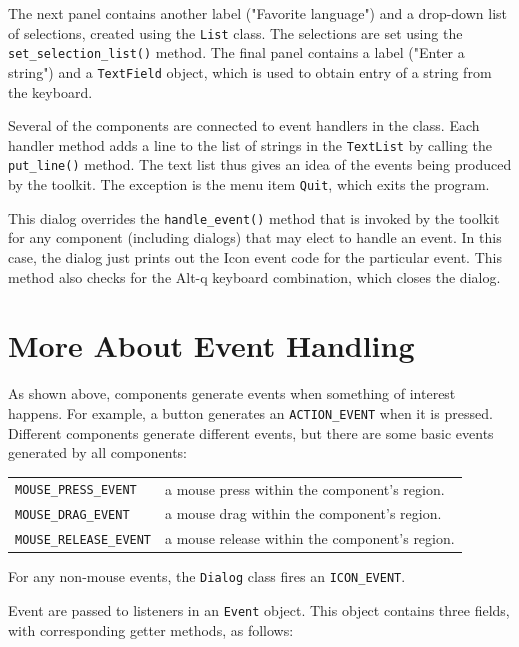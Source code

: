 The next panel contains another label ("Favorite
language") and a drop-down list of selections, created
using the \texttt{List} class. The selections are set using the
\texttt{set\_selection\_list()} method. The final panel contains a
label ("Enter a string") and a
\texttt{TextField} object, which is used to obtain entry of a string
from the keyboard.

Several of the components are connected to event handlers in the class.
Each handler method adds a line to the list of strings in the
\texttt{TextList} by calling the \texttt{put\_line()} method. The text
list thus gives an idea of the events being produced by the toolkit.
The exception is the menu item \texttt{Quit}, which exits the
program.

This dialog overrides the \texttt{handle\_event()} method that is
invoked by the toolkit for any component (including dialogs)
that may elect to handle an event. In this case, the dialog just
prints out the Icon event code for the particular event. This method
also checks for the Alt-q keyboard combination, which closes the
dialog.

\section{More About Event Handling}

As shown above, components generate events when
something of interest happens. For example, a button generates an
\texttt{ACTION\_EVENT} when it is pressed. Different components
generate different events, but there are some basic events generated by
all components:

\vspace{0.15in}
\begin{supertabular}{m{2.2in} m{3.5in}}
\texttt{MOUSE\_PRESS\_EVENT} &
 a mouse press within the component's
region.\\
\texttt{MOUSE\_DRAG\_EVENT} &
 a mouse drag within the component's
region.\\
\texttt{MOUSE\_RELEASE\_EVENT} &
 a mouse release within the component's
region.\\
\end{supertabular}
\vspace{0.15in}

\noindent For any non-mouse events, the \texttt{Dialog} class fires an
\texttt{ICON\_EVENT}.

Event are passed to listeners in an \texttt{Event}
object. This object contains three fields,
with corresponding getter methods, as follows:

